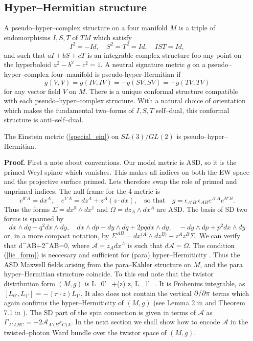 \subsection{Hyper--Hermitian structure}
A pseudo--hyper--complex structure on a four manifold $M$ is a triple of endomorphisms
$I, S, T$ of $TM$ which satisfy
\[
I^2=-Id, \quad S^2=T^2=Id, \quad IST=Id,
\]
and such that $aI+bS+cT$ is an integrable complex structure foo any point 
on the hyperboloid $a^2-b^2-c^2=1$.
A neutral signature metric $g$ on a pseudo--hyper--complex four--manifold is pseudo-hyper-Hermitian
if
\[
g(V, V)=g(IV, IV)=-g(SV, SV)=-g(TV, TV)
\]
for any vector field $V$ on $M$. There is a unique conformal structure compatible
with each pseudo--hyper--complex structure. With a natural choice of orientation
which makes the fundamental two--forms of $I, S, T$  self--dual, 
this conformal structure is anti--self--dual.
\begin{prop}
\label{propHH}
The Einstein metric (\ref{special_ein}) on $SL(3)/GL(2)$ is pseudo--hyper--Hermitian.
\end{prop}
\noindent
{\bf Proof.}
First a note about conventions.
Our model metric is ASD, so it is the primed Weyl spinor which vanishes. This makes all indices on both the EW space and the projective surface primed. Lets therefore swap the role of primed and unprimed indices. The null frame for the 4-metric is
\[
e^{0'A}=dx^A, \quad e^{1'A}=dz^A+z^A(z\cdot dx), \quad\mbox{so that}\quad
g=\epsilon_{A'B'}\epsilon_{AB}e^{A'A}e^{B'B}.
\]
Thus the forms $\Sigma=dx^0\wedge dx^1$ and $\Omega=dz_A\wedge dx^A$ are ASD. The basis of SD two forms is spanned by
\[
dx\wedge dq+ q^2 dx\wedge dy,\quad
dx\wedge dp-dy\wedge dq+2 pq dx\wedge dy,
\quad
-dy\wedge dp+ p^2 dx\wedge dy
\]
or, in a more compact notation, by
$\Sigma^{AB}=dx^{(A}\wedge dz^{B)}+z^Az^B \Sigma$.
We can verify that
\be
\label{lie_form}
d\Sigma^{AB}+2{{}}\wedge\Sigma^{AB}=0,
\ee
where ${{\mathcal A}}= z_Adx^A$ is such that $d{{\mathcal{A}}}= \Omega$. 
The condition (\ref{lie_form}) is neccesary and sufficient for (para) hyper--Hermiticity
\cite{boyer, D99}.
Thus the ASD
Maxwell fields arising from the para--K\"ahler structure on $M$, and the para hyper--Hermitian structure coincide.
To this end note that the twistor distribution form $(M,  g)$ is
\be
\label{tdistribution}
L_{0'}=\pi\cdot{}+(z\cdot\pi) z\cdot{}, \quad
L_{1'}=\pi\cdot{}.
\ee
It is Frobenius integrable, as $[L_{0'}, L_{1'}]=-(\pi\cdot z)L_{1'}$. It also does not contain the vertical $\partial/\partial \pi$ terms which again confirms the hyper--Hermiticity
of $(M, g)$ (see Lemma 2 in \cite{D99} and Theorem  7.1 in \cite{Cal2}). The SD part of the
spin connection is given in terms of ${\mathcal A}$ as
$\Gamma_{A'ABC}=-2{\mathcal A}_{A'(B}\epsilon_{C)A}$.
\koniec
In the next section we shall show how to encode
${\mathcal A}$ in the twisted--photon Ward bundle over the twistor space
of $(M, g)$.
